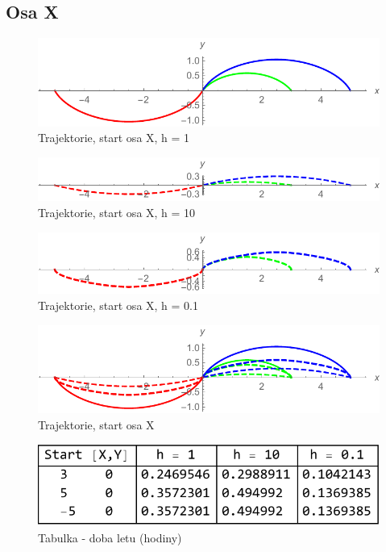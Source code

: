 \documentclass[reqno, a4paper]{amsart}
\numberwithin{equation}{section}
\begin{document}
\subsection{Osa X}
\label{sec: OsaX}

\begin{figure}
\includegraphics[scale=0.7]{figures/OsaX2.pdf}
\caption{Trajektorie, start osa X, h = 1}
\label{Xtraj1}
\end{figure}
\begin{figure}
\includegraphics[scale=0.7]{figures/OsaX3.pdf}
\caption{Trajektorie, start osa X, h = 10}
\label{Xtraj10}
\end{figure}
\begin{figure}
\includegraphics[scale=0.7]{figures/OsaX4.pdf}
\caption{Trajektorie, start osa X, h = 0.1}
\label{Xtraj0.1}
\end{figure}
\begin{figure}
\includegraphics[scale=0.7]{figures/OsaX1.pdf}
\caption{Trajektorie, start osa X}
\label{Xtraj}
\end{figure}
\begin{figure}
\includegraphics[scale=0.7]{figures/OsaX - tab. čas.pdf}
\caption{Tabulka - doba letu (hodiny)}
\label{TabX1}
\end{figure}
\end{document}
